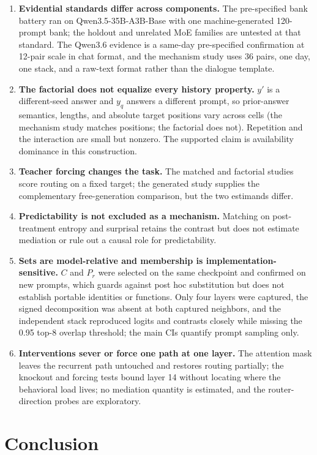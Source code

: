 \documentclass[10pt,a4paper,twocolumn]{article}
\begin{document}
\begin{enumerate}[leftmargin=1.4em,itemsep=2pt]
\item \textbf{Evidential standards differ across components.} The
pre-specified bank battery ran on Qwen3.5-35B-A3B-Base with one
machine-generated 120-prompt bank; the holdout and unrelated MoE families are
untested at that standard. The Qwen3.6 evidence is a same-day pre-specified
confirmation at 12-pair scale in chat format, and the mechanism study uses 36
pairs, one day, one stack, and a raw-text format rather than the dialogue
template.
\item \textbf{The factorial does not equalize every history property.}
\(y'\) is a different-seed answer and \(y_q\) answers a different prompt, so
prior-answer semantics, lengths, and absolute target positions vary across
cells (the mechanism study matches positions; the factorial does not).
Repetition and the interaction are small but nonzero. The supported claim is
availability dominance in this construction.
\item \textbf{Teacher forcing changes the task.} The matched and factorial
studies score routing on a fixed target; the generated study supplies the
complementary free-generation comparison, but the two estimands differ.
\item \textbf{Predictability is not excluded as a mechanism.} Matching on
post-treatment entropy and surprisal retains the contrast but does not
estimate mediation or rule out a causal role for predictability.
\item \textbf{Sets are model-relative and membership is
implementation-sensitive.} \(C\) and \(P_r\) were selected on the same
checkpoint and confirmed on new prompts, which guards against post hoc
substitution but does not establish portable identities or functions. Only
four layers were captured, the signed decomposition was absent at both
captured neighbors, and the independent stack reproduced logits and contrasts
closely while missing the 0.95 top-8 overlap threshold; the main CIs quantify
prompt sampling only.
\item \textbf{Interventions sever or force one path at one layer.} The
attention mask leaves the recurrent path untouched and restores routing
partially; the knockout and forcing tests bound layer 14 without locating
where the behavioral load lives; no mediation quantity is estimated, and the
router-direction probes are exploratory.
\end{enumerate}

\section{Conclusion}\label{sec:conclusion}
\end{document}
